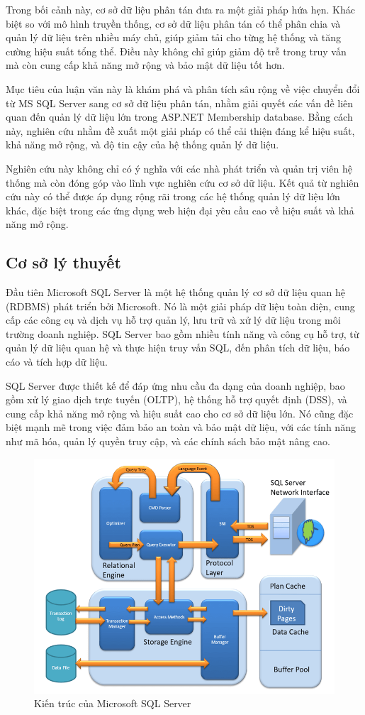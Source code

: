 \documentclass{article}[14pt]
\begin{document}
{Trong bối cảnh này, cơ sở dữ liệu phân tán đưa ra một giải pháp hứa hẹn. Khác biệt so với mô hình truyền thống, cơ sở dữ liệu phân tán có thể phân chia và quản lý dữ liệu trên nhiều máy chủ, giúp giảm tải cho từng hệ thống và tăng cường hiệu suất tổng thể. Điều này không chỉ giúp giảm độ trễ trong truy vấn mà còn cung cấp khả năng mở rộng và bảo mật dữ liệu tốt hơn.

Mục tiêu của luận văn này là khám phá và phân tích sâu rộng về việc chuyển đổi từ MS SQL Server sang cơ sở dữ liệu phân tán, nhằm giải quyết các vấn đề liên quan đến quản lý dữ liệu lớn trong ASP.NET Membership database. Bằng cách này, nghiên cứu nhằm đề xuất một giải pháp có thể cải thiện đáng kể hiệu suất, khả năng mở rộng, và độ tin cậy của hệ thống quản lý dữ liệu.

Nghiên cứu này không chỉ có ý nghĩa với các nhà phát triển và quản trị viên hệ thống mà còn đóng góp vào lĩnh vực nghiên cứu cơ sở dữ liệu. Kết quả từ nghiên cứu này có thể được áp dụng rộng rãi trong các hệ thống quản lý dữ liệu lớn khác, đặc biệt trong các ứng dụng web hiện đại yêu cầu cao về hiệu suất và khả năng mở rộng.

\subsection{Cơ sở lý thuyết}
Đầu tiên Microsoft SQL Server là một hệ thống quản lý cơ sở dữ liệu quan hệ (RDBMS) phát triển bởi Microsoft. Nó là một giải pháp dữ liệu toàn diện, cung cấp các công cụ và dịch vụ hỗ trợ quản lý, lưu trữ và xử lý dữ liệu trong môi trường doanh nghiệp. SQL Server bao gồm nhiều tính năng và công cụ hỗ trợ, từ quản lý dữ liệu quan hệ và thực hiện truy vấn SQL, đến phân tích dữ liệu, báo cáo và tích hợp dữ liệu.

SQL Server được thiết kế để đáp ứng nhu cầu đa dạng của doanh nghiệp, bao gồm xử lý giao dịch trực tuyến (OLTP), hệ thống hỗ trợ quyết định (DSS), và cung cấp khả năng mở rộng và hiệu suất cao cho cơ sở dữ liệu lớn. Nó cũng đặc biệt mạnh mẽ trong việc đảm bảo an toàn và bảo mật dữ liệu, với các tính năng như mã hóa, quản lý quyền truy cập, và các chính sách bảo mật nâng cao.



\begin{figure}
   \centering
    \includegraphics[width=0.7\linewidth]{images/SQLServerAr1.png}
    \caption{Kiến trúc của Microsoft SQL Server}
    \label{fig:overviewsmssql}
\end{figure}

}
\end{document}
